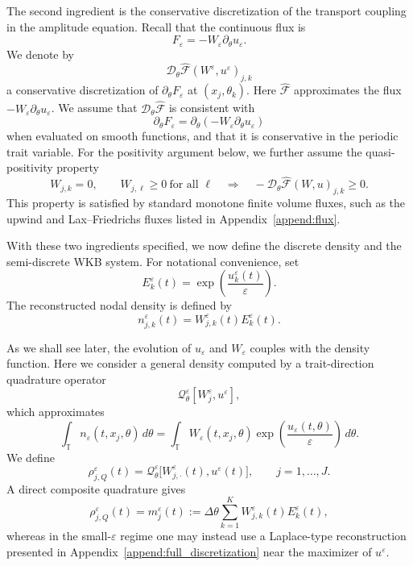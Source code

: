 \documentclass[11pt]{article}
\begin{document}
The second ingredient is the conservative discretization of the transport
coupling in the amplitude equation. Recall that the continuous flux is
\[
F_\varepsilon=-W_\varepsilon\partial_\theta u_\varepsilon .
\]
We denote by
\[
\mathcal D_\theta\widehat{\mathcal F}(W^\varepsilon,u^\varepsilon)_{j,k}
\]
a conservative discretization of \(\partial_\theta F_\varepsilon\) at
\((x_j,\theta_k)\). Here \(\widehat{\mathcal F}\) approximates the flux
\(-W_\varepsilon\partial_\theta u_\varepsilon\). We assume that
\(\mathcal D_\theta\widehat{\mathcal F}\) is consistent with
\[
\partial_\theta F_\varepsilon
=
\partial_\theta(-W_\varepsilon\partial_\theta u_\varepsilon)
\]
when evaluated on smooth functions, and that it is conservative in the
periodic trait variable. For the positivity argument below, we further assume
the quasi-positivity property
\begin{equation}\label{ass:H_flux}
W_{j,k}=0,
\qquad
W_{j,\ell}\ge0\ \text{for all }\ell
\quad\Longrightarrow\quad
-\mathcal D_\theta\widehat{\mathcal F}(W,u)_{j,k}\ge0 .
\end{equation}
This property is satisfied by standard monotone finite volume fluxes, such as
the upwind and Lax--Friedrichs fluxes listed in Appendix~\ref{append:flux}.

With these two ingredients specified, we now define the discrete density and
the semi-discrete WKB system. For notational convenience, set
\begin{equation}\label{def:E}
E_k^\varepsilon(t)
=
\exp\!\left(\frac{u_k^\varepsilon(t)}{\varepsilon}\right).
\end{equation}
The reconstructed nodal density is defined by
\begin{equation}\label{def:n_reconstructed}
n_{j,k}^\varepsilon(t)
=
W_{j,k}^\varepsilon(t)E_k^\varepsilon(t).
\end{equation}


As we shall see later, the evolution of $u_\varepsilon$ and $W_\varepsilon$ 
couples with the density function. 
Here we consider a general density computed by a
trait-direction quadrature operator
\[
\mathcal Q_\theta^\varepsilon[W_j^\varepsilon,u^\varepsilon],
\]
which approximates
\[
\int_{\mathbb T}
n_\varepsilon(t,x_j,\theta)
\,d\theta 
=
\int_{\mathbb T}
W_\varepsilon(t,x_j,\theta)
\exp\!\left(\frac{u_\varepsilon(t,\theta)}{\varepsilon}\right)
\,d\theta .
\]
We define
\begin{equation}\label{eq:E_rho}
\rho_{j,Q}^\varepsilon(t)
=
\mathcal Q_\theta^\varepsilon
\bigl[W_{j,\cdot}^\varepsilon(t),u^\varepsilon(t)\bigr],
\qquad
j=1,\dots,J .
\end{equation}
A direct composite quadrature gives
\begin{equation} \label{def:m}
\rho_{j,Q}^\varepsilon(t)
=
m_j^\varepsilon(t)
:=
\Delta\theta
\sum_{k=1}^K
W_{j,k}^\varepsilon(t)E_k^\varepsilon(t),
\end{equation}
whereas in the small-\(\varepsilon\) regime one may instead use a
Laplace-type reconstruction presented in
Appendix~\ref{append:full_discretization} near the maximizer of
\(u^\varepsilon\).
\end{document}
